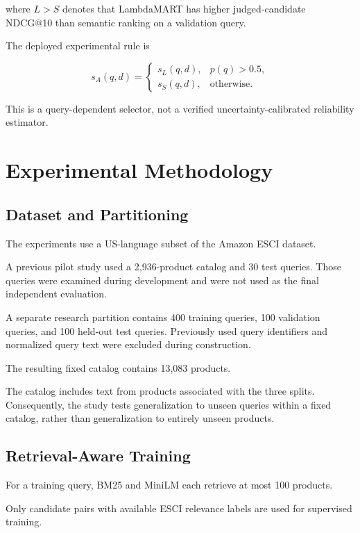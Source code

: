 \documentclass[conference]{IEEEtran}
\begin{document}
where $L>S$ denotes that LambdaMART
has higher judged-candidate
NDCG@10 than semantic ranking
on a validation query.

The deployed experimental rule is

\begin{equation}
s_A(q,d)=
\begin{cases}
s_L(q,d), & p(q)>0.5,\\
s_S(q,d), & \text{otherwise}.
\end{cases}
\end{equation}

This is a query-dependent selector,
not a verified uncertainty-calibrated
reliability estimator.

\section{Experimental Methodology}

\subsection{Dataset and Partitioning}

The experiments use a US-language
subset of the Amazon ESCI dataset.

A previous pilot study used a
2,936-product catalog and 30 test
queries. Those queries were examined
during development and were not used
as the final independent evaluation.

A separate research partition
contains 400 training queries,
100 validation queries, and
100 held-out test queries.
Previously used query identifiers
and normalized query text were
excluded during construction.

The resulting fixed catalog
contains 13,083 products.

The catalog includes text from
products associated with the three
splits. Consequently, the study
tests generalization to unseen
queries within a fixed catalog,
rather than generalization to
entirely unseen products.

\subsection{Retrieval-Aware Training}

For a training query, BM25 and
MiniLM each retrieve at most
100 products.

Only candidate pairs with
available ESCI relevance labels
are used for supervised training.
\end{document}

